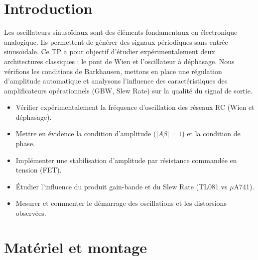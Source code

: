 \documentclass[11pt,a4paper]{report}
\begin{document}
\chapter*{Introduction}

Les oscillateurs sinusoïdaux sont des éléments fondamentaux en électronique analogique.
Ils permettent de générer des signaux périodiques sans entrée sinusoïdale. Ce TP a
pour objectif d'étudier expérimentalement deux architectures classiques : le pont de
Wien et l'oscillateur à déphasage. Nous vérifions les conditions de Barkhausen,
mettons en place une régulation d'amplitude automatique et analysons l'influence des
caractéristiques des amplificateurs opérationnels (GBW, Slew Rate) sur la qualité
du signal de sortie.

\begin{objectifbox}
\begin{itemize}
    \item Vérifier expérimentalement la fréquence d'oscillation des réseaux RC (Wien et déphasage).
    \item Mettre en évidence la condition d'amplitude ($|A\beta|=1$) et la condition de phase.
    \item Implémenter une stabilisation d'amplitude par résistance commandée en tension (FET).
    \item Étudier l'influence du produit gain-bande et du Slew Rate (TL081 vs $\mu$A741).
    \item Mesurer et commenter le démarrage des oscillations et les distorsions observées.
\end{itemize}
\end{objectifbox}

\clearpage

\chapter{Matériel et montage}
\end{document}
